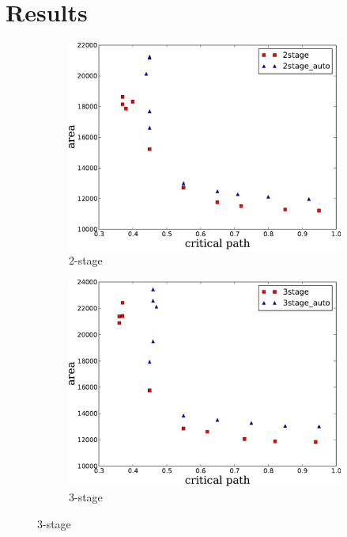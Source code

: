 \section{Results}
\begin{figure}[htb]
\centering
  \begin{subfigure}[t]{0.47\textwidth}
  \centering
  \includegraphics[width=\textwidth]{figures/2stage.pdf}
  \caption{2-stage}
  \label{fig:2stage}
  \vspace{20pt}
  \end{subfigure}
  \hfill
  \begin{subfigure}[t]{0.47\textwidth}
  \centering
  \includegraphics[width=\textwidth]{figures/3stage.pdf}
  \caption{3-stage}

\end{subfigure}
\end{figure}
